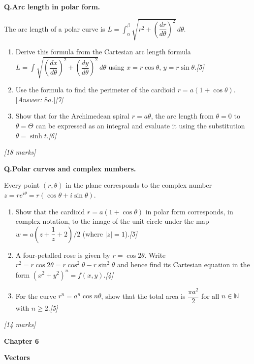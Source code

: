 \documentclass[12pt,a4paper]{article}
\theoremstyle{defstyle}
\newcounter{qnum}
\newcommand{\Q}[1]{\stepcounter{qnum}\medskip\noindent\textbf{Q\theqnum.}\quad #1\par}
\newcommand{\mks}[1]{\hfill\textit{[#1 marks]}}
\newcommand{\chapterbanner}[2]{%
  \clearpage
  \begin{tcolorbox}[colback=chaptercol!10, colframe=chaptercol,
      left=10pt, right=10pt, top=8pt, bottom=8pt]
    {\large\bfseries\color{chaptercol} Chapter #1}\par\vspace{2pt}
    {\LARGE\bfseries #2}
  \end{tcolorbox}
  \vspace{6pt}
}
\begin{document}
\begin{tcolorbox}[explore, title={\color{explorecol}\bfseries Exploration (Beyond Syllabus)}]

\Q{\textbf{Arc length in polar form.}

The arc length of a polar curve is $L=\int_\alpha^\beta\sqrt{r^2+\left(\dfrac{dr}{d\theta}\right)^2}\,d\theta$.
\begin{enumerate}[label=(\alph*),itemsep=4pt]
  \item Derive this formula from the Cartesian arc length formula $L=\int\sqrt{\left(\dfrac{dx}{d\theta}\right)^2+\left(\dfrac{dy}{d\theta}\right)^2}\,d\theta$ using $x=r\cos\theta$, $y=r\sin\theta$.\hfill\textit{[5]}
  \item Use the formula to find the perimeter of the cardioid $r=a(1+\cos\theta)$. [\textit{Answer: $8a$.}]\hfill\textit{[7]}
  \item Show that for the Archimedean spiral $r=a\theta$, the arc length from $\theta=0$ to $\theta=\Theta$ can be expressed as an integral and evaluate it using the substitution $\theta=\sinh t$.\hfill\textit{[6]}
\end{enumerate}\mks{18}}

\Q{\textbf{Polar curves and complex numbers.}

Every point $(r,\theta)$ in the plane corresponds to the complex number $z=re^{i\theta}=r(\cos\theta+i\sin\theta)$.
\begin{enumerate}[label=(\alph*),itemsep=4pt]
  \item Show that the cardioid $r=a(1+\cos\theta)$ in polar form corresponds, in complex notation, to the image of the unit circle under the map $w=a\left(z+\dfrac{1}{z}+2\right)/2$ (where $|z|=1$).\hfill\textit{[5]}
  \item A four-petalled rose is given by $r=\cos2\theta$. Write $r^2=r\cos2\theta=r\cos^2\theta-r\sin^2\theta$ and hence find its Cartesian equation in the form $(x^2+y^2)^n=f(x,y)$.\hfill\textit{[4]}
  \item For the curve $r^n=a^n\cos n\theta$, show that the total area is $\dfrac{\pi a^2}{2}$ for all $n\in\mathbb{N}$ with $n\geq2$.\hfill\textit{[5]}
\end{enumerate}\mks{14}}

\end{tcolorbox}

\chapterbanner{6}{Vectors}
\end{document}
